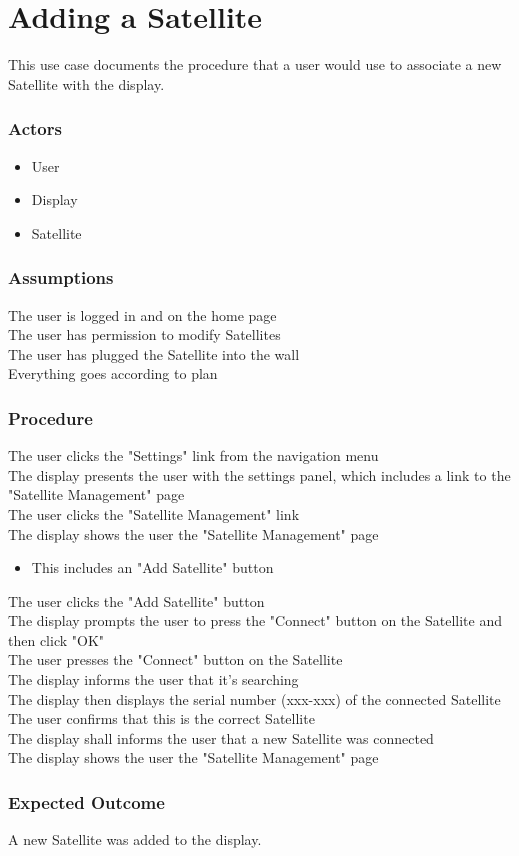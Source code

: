 \section{Adding a Satellite}

This use case documents the procedure that a user would use to associate a new Satellite with the display.

\subsubsection{Actors}
\begin{itemize}
	\item User
	\item Display
	\item Satellite
\end{itemize}

\subsubsection{Assumptions}

The user is logged in and on the home page\\
The user has permission to modify Satellites\\
The user has plugged the Satellite into the wall\\
Everything goes according to plan

\subsubsection{Procedure}

The user clicks the "Settings" link from the navigation menu\\
The display presents the user with the settings panel, which includes a link to the "Satellite Management" page\\
The user clicks the "Satellite Management" link\\
The display shows the user the "Satellite Management" page
\begin{itemize}
	\item This includes an "Add Satellite" button
\end{itemize}
The user clicks the "Add Satellite" button\\
The display prompts the user to press the "Connect" button on the Satellite and then click "OK"\\
The user presses the "Connect" button on the Satellite\\
The display informs the user that it's searching\\
The display then displays the serial number (xxx-xxx) of the connected Satellite\\
The user confirms that this is the correct Satellite\\
The display shall informs the user that a new Satellite was connected\\
The display shows the user the "Satellite Management" page

\subsubsection{Expected Outcome}

A new Satellite was added to the display.